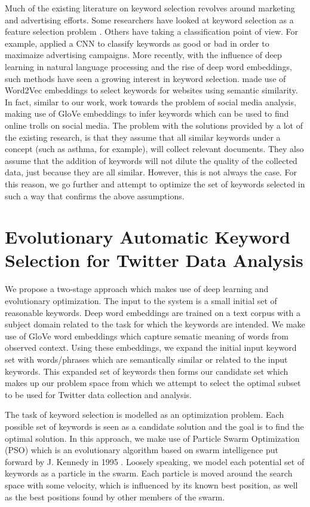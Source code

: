 \documentclass[runningheads]{llncs}
\begin{document}
Much of the existing literature on keyword selection revolves around marketing and advertising efforts. Some researchers have looked at keyword selection as a feature selection problem \cite{HREF1}. Others have taking a classification point of view. For example, \cite{HREF2} applied a CNN to classify keywords as good or bad in order to maximaize advertising campaigns. More recently, with the influence of deep learning in natural language processing and the rise of deep word embeddings, such methods have seen a growing interest in keyword selection. \cite{HREF3} made use of Word2Vec embeddings to select keywords for websites using semantic similarity. In fact, similar to our work, \cite{HREF4} work towards the problem of social media analysis, making use of GloVe embeddings to infer keywords which can be used to find online trolls on social media. The problem with the solutions provided by a lot of the existing research, is that they assume that all similar keywords under a concept (such as asthma, for example), will collect relevant documents. They also assume that the addition of keywords will not dilute the quality of the collected data, just because they are all similar. However, this is not always the case. For this reason, we go further and attempt to optimize the set of keywords selected in such a way that confirms the above assumptions. 

\section{Evolutionary Automatic Keyword Selection for Twitter Data Analysis}
We propose a two-stage approach which makes use of deep learning and evolutionary optimization. The input to the system is a small initial set of reasonable keywords. Deep word embeddings are trained on a text corpus with a subject domain related to the task for which the keywords are intended. We make use of GloVe \cite{REF13} word embeddings which capture sematic meaning of words from observed context. Using these embeddings, we expand the initial input keyword set with words/phrases which are semantically similar or related to the input keywords. This expanded set of keywords then forms our candidate set which makes up our problem space from which we attempt to select the optimal subset to be used for Twitter data collection and analysis.

The task of keyword selection is modelled as an optimization problem. Each possible set of keywords is seen as a candidate solution and the goal is to find the optimal solution. In this approach, we make use of Particle Swarm Optimization (PSO) which is an evolutionary algorithm based on swarm intelligence put forward by J. Kennedy in 1995 \cite{K_REF7}. Loosely speaking, we model each potential set of keywords as a particle in the swarm. Each particle is moved around the search space with some velocity, which is influenced by its known best position, as well as the best positions found by other members of the swarm. 
\end{document}
